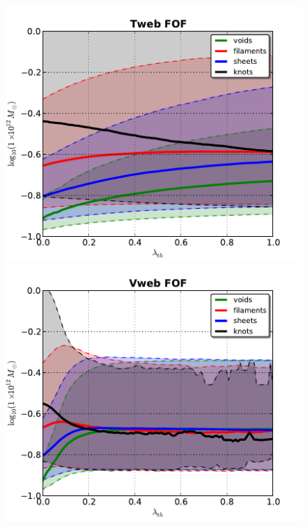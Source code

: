 \documentclass[a4,useAMS,usenatbib,usegraphicx]{latex/mn2e}
\begin{document}
\begin{flushleft}
\begin{figure}
\centering

  \includegraphics[trim = 0mm 0mm 0mm 0mm, clip, keepaspectratio=true,
  width=0.3\textheight]{./figures/halos_typical_mass_FOF_Tweb.pdf}
  \includegraphics[trim = 0mm 0mm 0mm 0mm, clip, keepaspectratio=true,
  width=0.3\textheight]{./figures/halos_typical_mass_FOF_Vweb.pdf}  
  

\end{figure}
\end{flushleft}
\end{document}
